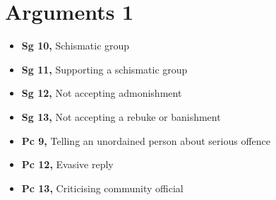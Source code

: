 \chapter{Arguments 1}

\begin{itemize}
\tightlist
\item
  \textbf{Sg 10,} Schismatic group
\item
  \textbf{Sg 11,} Supporting a schismatic group
\item
  \textbf{Sg 12,} Not accepting admonishment
\item
  \textbf{Sg 13,} Not accepting a rebuke or banishment
\item
  \textbf{Pc 9,} Telling an unordained person about serious offence
\item
  \textbf{Pc 12,} Evasive reply
\item
  \textbf{Pc 13,} Criticising community official
\end{itemize}

